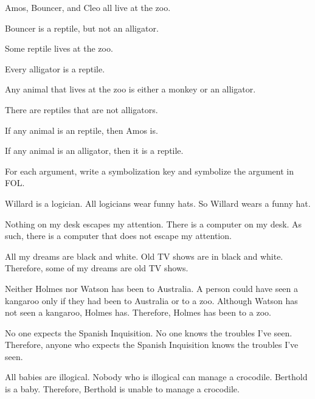 \begin{earg}
\item Amos, Bouncer, and Cleo all live at the zoo.
\item Bouncer is a reptile, but not an alligator.
\item Some reptile lives at the zoo.
\item Every alligator is a reptile.
\item Any animal that lives at the zoo is either a monkey or an alligator.
\item There are reptiles that are not alligators.
\item If any animal is an reptile, then Amos is.
\item If any animal is an alligator, then it is a reptile.
\end{earg}

\problempart
\label{pr.FOLarguments}
For each argument, write a symbolization key and symbolize the argument in FOL.
\begin{earg}
\item Willard is a logician. All logicians wear funny hats. So Willard wears a funny hat.
\item Nothing on my desk escapes my attention. There is a computer on my desk. As such, there is a computer that does not escape my attention.
\item All my dreams are black and white. Old TV shows are in black and white. Therefore, some of my dreams are old TV shows.
\item Neither Holmes nor Watson has been to Australia. A person could have seen a kangaroo only if they had been to Australia or to a zoo. Although Watson has not seen a kangaroo, Holmes has. Therefore, Holmes has been to a zoo.
\item No one expects the Spanish Inquisition. No one knows the troubles I've seen. Therefore, anyone who expects the Spanish Inquisition knows the troubles I've seen.
\item All babies are illogical. Nobody who is illogical can manage a crocodile. Berthold is a baby. Therefore, Berthold is unable to manage a crocodile.
\end{earg}

